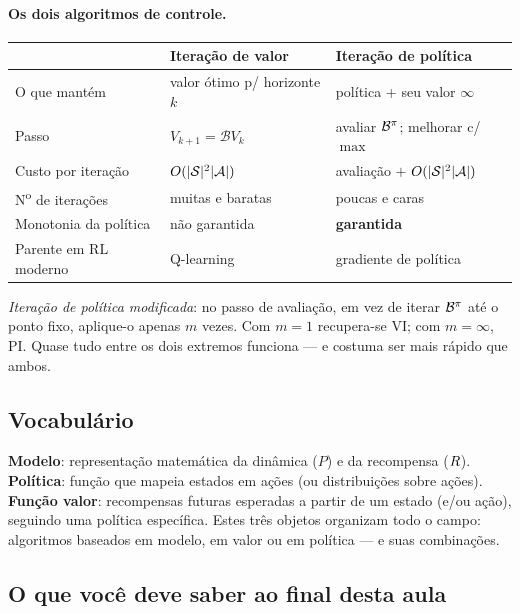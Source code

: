 \documentclass[11pt, a4paper]{article}
\newcommand{\Bop}{\mathcal{B}}
\newcommand{\Bpol}{\mathcal{B}^{\pol}}
\begin{document}
\paragraph{Os dois algoritmos de controle.}

\begin{center}
\begin{tabular}{@{}p{4.0cm}p{4.5cm}p{4.5cm}@{}}
\toprule
 & \textbf{Iteração de valor} & \textbf{Iteração de política} \\
\midrule
O que mantém & valor ótimo p/ horizonte $k$ & política + seu valor $\infty$ \\
Passo & $V_{k+1} = \Bop V_k$ & avaliar $\Bpol$; melhorar c/ $\max$ \\
Custo por iteração & $O(\lvert\mathcal{S}\rvert^2 \lvert\mathcal{A}\rvert)$ & avaliação $+$ $O(\lvert\mathcal{S}\rvert^2 \lvert\mathcal{A}\rvert)$ \\
N\textsuperscript{o} de iterações & muitas e baratas & poucas e caras \\
Monotonia da política & não garantida & \textbf{garantida} \\
Parente em RL moderno & Q\mbox{-}learning & gradiente de política \\
\bottomrule
\end{tabular}
\end{center}

\begin{ideiabox}
\emph{Iteração de política modificada}: no passo de avaliação, em vez de iterar $\Bpol$
até o ponto fixo, aplique-o apenas $m$ vezes. Com $m = 1$ recupera-se VI; com
$m = \infty$, PI. Quase tudo entre os dois extremos funciona --- e costuma ser mais
rápido que ambos.
\end{ideiabox}

\subsection{Vocabulário}

\textbf{Modelo}: representação matemática da dinâmica ($P$) e da recompensa ($R$).
\textbf{Política}: função que mapeia estados em ações (ou distribuições sobre ações).
\textbf{Função valor}: recompensas futuras esperadas a partir de um estado (e/ou ação),
seguindo uma política específica. Estes três objetos organizam todo o campo: algoritmos
baseados em modelo, em valor ou em política --- e suas combinações.

\subsection{O que você deve saber ao final desta aula}
\end{document}
